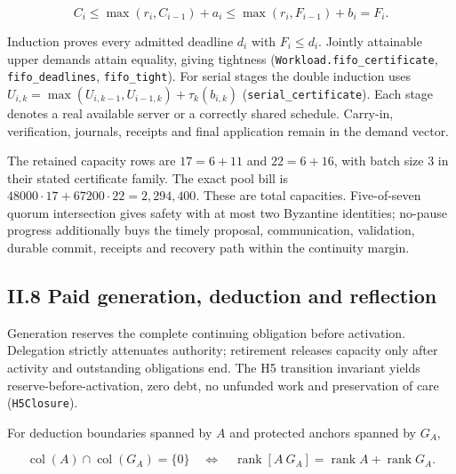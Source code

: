 \documentclass[
]{article}
\begin{document}
\[
C_i\le\max(r_i,C_{i-1})+a_i
\le\max(r_i,F_{i-1})+b_i=F_i.
\]

Induction proves every admitted deadline \(d_i\) with \(F_i\le d_i\).
Jointly attainable upper demands attain equality, giving tightness
(\texttt{W\allowbreak{}o\allowbreak{}r\allowbreak{}k\allowbreak{}l\allowbreak{}o\allowbreak{}a\allowbreak{}d\allowbreak{}.\allowbreak{}f\allowbreak{}i\allowbreak{}f\allowbreak{}o\allowbreak{}\_\allowbreak{}c\allowbreak{}e\allowbreak{}r\allowbreak{}t\allowbreak{}i\allowbreak{}f\allowbreak{}i\allowbreak{}c\allowbreak{}a\allowbreak{}t\allowbreak{}e},
\texttt{fifo\_deadlines}, \texttt{fifo\_tight}). For serial stages the
double induction uses
\(U_{i,k}=\max(U_{i,k-1},U_{i-1,k})+\tau_k(b_{i,k})\)
(\texttt{s\allowbreak{}e\allowbreak{}r\allowbreak{}i\allowbreak{}a\allowbreak{}l\allowbreak{}\_\allowbreak{}c\allowbreak{}e\allowbreak{}r\allowbreak{}t\allowbreak{}i\allowbreak{}f\allowbreak{}i\allowbreak{}c\allowbreak{}a\allowbreak{}t\allowbreak{}e}).
Each stage denotes a real available server or a correctly shared
schedule. Carry-in, verification, journals, receipts and final
application remain in the demand vector.

The retained capacity rows are \(17=6+11\) and \(22=6+16\), with batch
size 3 in their stated certificate family. The exact pool bill is
\(48000\cdot17+67200\cdot22=2{,}294{,}400\). These are total capacities.
Five-of-seven quorum intersection gives safety with at most two
Byzantine identities; no-pause progress additionally buys the timely
proposal, communication, validation, durable commit, receipts and
recovery path within the continuity margin.

\subsection{II.8 Paid generation, deduction and
reflection}\label{ii.8-paid-generation-deduction-and-reflection}

Generation reserves the complete continuing obligation before
activation. Delegation strictly attenuates authority; retirement
releases capacity only after activity and outstanding obligations end.
The H5 transition invariant yields reserve-before-activation, zero debt,
no unfunded work and preservation of care (\texttt{H5Closure}).

For deduction boundaries spanned by \(A\) and protected anchors spanned
by \(G_A\),

\[
\operatorname{col}(A)\cap\operatorname{col}(G_A)=\{0\}
\quad\Longleftrightarrow\quad
\operatorname{rank}[A\ G_A]=\operatorname{rank}A+\operatorname{rank}G_A.
\]
\end{document}
